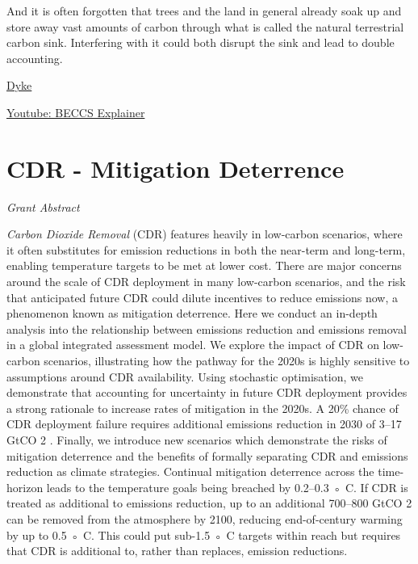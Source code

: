 \documentclass[
]{book}
\begin{document}
And it is often forgotten that trees and the land in general already soak up and store away vast amounts of carbon through what is called the natural terrestrial carbon sink. Interfering with it could both disrupt the sink and lead to double accounting.

\href{https://theconversation.com/climate-scientists-concept-of-net-zero-is-a-dangerous-trap-157368}{Dyke}

\href{https://www.youtube.com/watch?v=24ESlXSa1sU\&feature=emb_imp_woyt}{Youtube: BECCS Explainer}

\hypertarget{cdr---mitigation-deterrence}{%
\section{CDR - Mitigation Deterrence}\label{cdr---mitigation-deterrence}}

\emph{Grant Abstract}

\emph{Carbon Dioxide Removal} (CDR) features heavily in low-carbon scenarios, where it often substitutes
for emission reductions in both the near-term and long-term, enabling temperature targets to be
met at lower cost. There are major concerns around the scale of CDR deployment in many
low-carbon scenarios, and the risk that anticipated future CDR could dilute incentives to reduce
emissions now, a phenomenon known as mitigation deterrence. Here we conduct an in-depth
analysis into the relationship between emissions reduction and emissions removal in a global
integrated assessment model. We explore the impact of CDR on low-carbon scenarios, illustrating
how the pathway for the 2020s is highly sensitive to assumptions around CDR availability. Using
stochastic optimisation, we demonstrate that accounting for uncertainty in future CDR
deployment provides a strong rationale to increase rates of mitigation in the 2020s. A 20\% chance
of CDR deployment failure requires additional emissions reduction in 2030 of 3--17 GtCO 2 .
Finally, we introduce new scenarios which demonstrate the risks of mitigation deterrence and the
benefits of formally separating CDR and emissions reduction as climate strategies. Continual
mitigation deterrence across the time-horizon leads to the temperature goals being breached by
0.2--0.3 ◦ C. If CDR is treated as additional to emissions reduction, up to an additional
700--800 GtCO 2 can be removed from the atmosphere by 2100, reducing end-of-century warming
by up to 0.5 ◦ C. This could put sub-1.5 ◦ C targets within reach but requires that CDR is additional
to, rather than replaces, emission reductions.
\end{document}
